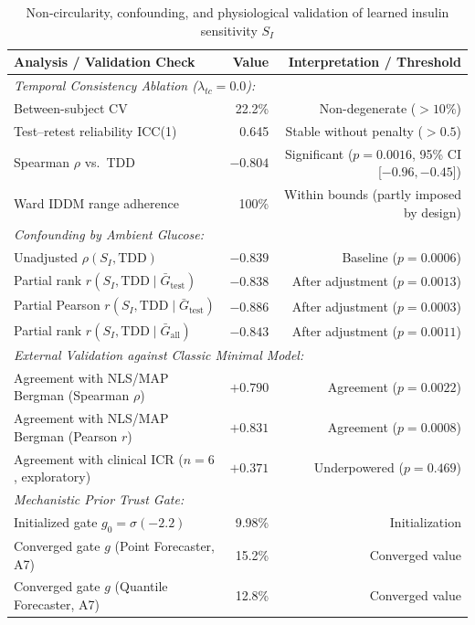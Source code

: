 \documentclass[journal]{IEEEtran}
\begin{document}
\begin{table}[t]
\centering
\caption{Non-circularity, confounding, and physiological validation of learned insulin sensitivity $S_I$}
\label{tab:si_circularity}
\footnotesize
\begin{tabular}{lrr}
\toprule
Analysis / Validation Check & Value & Interpretation / Threshold \\
\midrule
\multicolumn{3}{l}{\textit{Temporal Consistency Ablation ($\lambda_{tc} = 0.0$):}} \\
Between-subject CV & 22.2\% & Non-degenerate ($> 10\%$) \\
Test--retest reliability ICC(1) & 0.645 & Stable without penalty ($> 0.5$) \\
Spearman $\rho$ vs.\ TDD & $-0.804$ & Significant ($p=0.0016$, 95\% CI [$-0.96, -0.45$]) \\
Ward IDDM range adherence & 100\% & Within bounds (partly imposed by design) \\
\midrule
\multicolumn{3}{l}{\textit{Confounding by Ambient Glucose:}} \\
Unadjusted $\rho(S_I, \text{TDD})$ & $-0.839$ & Baseline ($p = 0.0006$) \\
Partial rank $r(S_I, \text{TDD} \mid \bar{G}_{\text{test}})$ & $-0.838$ & After adjustment ($p = 0.0013$) \\
Partial Pearson $r(S_I, \text{TDD} \mid \bar{G}_{\text{test}})$ & $-0.886$ & After adjustment ($p = 0.0003$) \\
Partial rank $r(S_I, \text{TDD} \mid \bar{G}_{\text{all}})$ & $-0.843$ & After adjustment ($p = 0.0011$) \\
\midrule
\multicolumn{3}{l}{\textit{External Validation against Classic Minimal Model:}} \\
Agreement with NLS/MAP Bergman (Spearman $\rho$) & $+0.790$ & Agreement ($p = 0.0022$) \\
Agreement with NLS/MAP Bergman (Pearson $r$) & $+0.831$ & Agreement ($p = 0.0008$) \\
Agreement with clinical ICR ($n=6$, exploratory) & $+0.371$ & Underpowered ($p = 0.469$) \\
\midrule
\multicolumn{3}{l}{\textit{Mechanistic Prior Trust Gate:}} \\
Initialized gate $g_0 = \sigma(-2.2)$ & 9.98\% & Initialization \\
Converged gate $g$ (Point Forecaster, A7) & 15.2\% & Converged value \\
Converged gate $g$ (Quantile Forecaster, A7) & 12.8\% & Converged value \\
\bottomrule
\end{tabular}
\end{table}
\end{document}
